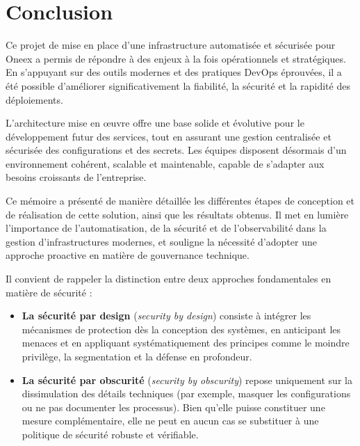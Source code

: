 
\section{Conclusion}

Ce projet de mise en place d'une infrastructure automatisée et sécurisée pour Oneex a permis de répondre à des enjeux à la fois opérationnels et stratégiques. En s’appuyant sur des outils modernes et des pratiques DevOps éprouvées, il a été possible d’améliorer significativement la fiabilité, la sécurité et la rapidité des déploiements.

L’architecture mise en œuvre offre une base solide et évolutive pour le développement futur des services, tout en assurant une gestion centralisée et sécurisée des configurations et des secrets. Les équipes disposent désormais d’un environnement cohérent, scalable et maintenable, capable de s’adapter aux besoins croissants de l’entreprise.

Ce mémoire a présenté de manière détaillée les différentes étapes de conception et de réalisation de cette solution, ainsi que les résultats obtenus. Il met en lumière l’importance de l’automatisation, de la sécurité et de l’observabilité dans la gestion d’infrastructures modernes, et souligne la nécessité d’adopter une approche proactive en matière de gouvernance technique.

Il convient de rappeler la distinction entre deux approches fondamentales en matière de sécurité :
\begin{itemize}
	\item \textbf{La sécurité par design} (\emph{security by design}) consiste à intégrer les mécanismes de protection dès la conception des systèmes, en anticipant les menaces et en appliquant systématiquement des principes comme le moindre privilège, la segmentation et la défense en profondeur.
	\item \textbf{La sécurité par obscurité} (\emph{security by obscurity}) repose uniquement sur la dissimulation des détails techniques (par exemple, masquer les configurations ou ne pas documenter les processus). Bien qu’elle puisse constituer une mesure complémentaire, elle ne peut en aucun cas se substituer à une politique de sécurité robuste et vérifiable.
\end{itemize}

